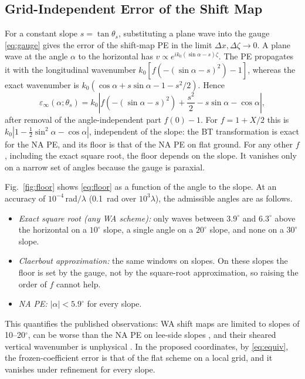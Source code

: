 \documentclass[journal]{IEEEtran}
\begin{document}
\subsection{Grid-Independent Error of the Shift Map}
For a constant slope $s=\tan\theta_s$, substituting a plane wave into the
gauge \eqref{eq:gauge} gives the error of the shift-map PE in the limit
$\Delta x,\Delta\zeta\to0$. A plane wave at the angle $\alpha$ to the horizontal
has $v\propto e^{ik_0(\sin\alpha-s)\zeta}$. The PE propagates it with the
longitudinal wavenumber $k_0[f(-(\sin\alpha-s)^2)-1]$, whereas the exact
wavenumber is $k_0(\cos\alpha+s\sin\alpha-1-s^2/2)$. Hence
\begin{equation}\label{eq:floor}
\varepsilon_\infty(\alpha;\theta_s)=k_0\left|f\left(-(\sin\alpha-s)^2\right)+\frac{s^2}{2}-s\sin\alpha-\cos\alpha\right|,
\end{equation}
after removal of the angle-independent part $f(0)-1$. For $f=1+X/2$ this is
$k_0|1-\frac12\sin^2\alpha-\cos\alpha|$, independent of the slope: the BT
transformation is exact for the NA PE, and its floor is that of the NA PE on
flat ground. For any other $f$, including the exact square root, the floor
depends on the slope. It vanishes only on a narrow set of angles because the
gauge is paraxial.

Fig.~\ref{fig:floor} shows \eqref{eq:floor} as a function of the angle to the
slope. At an accuracy of $10^{-4}$\,rad$/\lambda$ (\SI{0.1}{rad} over
$10^3\lambda$), the admissible angles are as follows.
\begin{itemize}
\item \emph{Exact square root (any WA scheme):} only waves between $3.9^\circ$
and $6.3^\circ$ above the horizontal on a $10^\circ$ slope, a single angle on a
$20^\circ$ slope, and none on a $30^\circ$ slope.
\item \emph{Claerbout approximation:} the same windows on slopes. On these
slopes the floor is set by the gauge, not by the square-root approximation, so
raising the order of $f$ cannot help.
\item \emph{NA PE:} $|\alpha|<5.9^\circ$ for every slope.
\end{itemize}
This quantifies the published observations: WA shift maps are limited to slopes
of 10--20$^\circ$, can be worse than the NA PE on lee-side slopes
\cite{wang2020smpe,zhou2017lfhighangle}, and their sheared vertical wavenumber
is unphysical \cite{gilbert2022wabt}. In the proposed coordinates, by
\eqref{eq:equiv}, the frozen-coefficient error is that of the flat
scheme on a local grid, and it vanishes under refinement for every slope.
\end{document}
